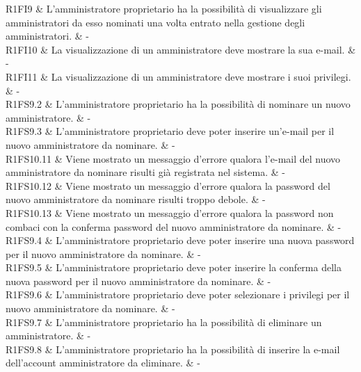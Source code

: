R1FI9 & L'amministratore proprietario ha la possibilità di visualizzare gli amministratori da esso nominati una volta entrato nella gestione degli amministratori.  & - \\

R1FI10 & La visualizzazione di un amministratore deve mostrare la sua e-mail.  & - \\

R1FI11 & La visualizzazione di un amministratore deve mostrare i suoi privilegi.  & - \\

R1FS9.2 & L'amministratore proprietario ha la possibilità di nominare un nuovo amministratore.  & - \\

R1FS9.3 & L'amministratore proprietario deve poter inserire un'e-mail per il nuovo amministratore da nominare.  & - \\

R1FS10.11 & Viene mostrato un messaggio d'errore qualora l'e-mail del nuovo amministratore da nominare risulti già registrata nel sistema.  & - \\

R1FS10.12 & Viene mostrato un messaggio d'errore qualora la password del nuovo amministratore da nominare risulti troppo debole.  & - \\

R1FS10.13 & Viene mostrato un messaggio d'errore qualora la password non combaci con la conferma password del nuovo amministratore da nominare.  & - \\

R1FS9.4 & L'amministratore proprietario deve poter inserire una nuova password per il nuovo amministratore da nominare.  & - \\

R1FS9.5 & L'amministratore proprietario deve poter inserire la conferma della nuova password per il nuovo amministratore da nominare.  & - \\

R1FS9.6 & L'amministratore proprietario deve poter selezionare i privilegi per il nuovo amministratore da nominare.  & - \\

R1FS9.7 & L'amministratore proprietario ha la possibilità di eliminare un amministratore.  & - \\

R1FS9.8 & L'amministratore proprietario ha la possibilità di inserire la e-mail dell'account amministratore da eliminare.  & - \\

